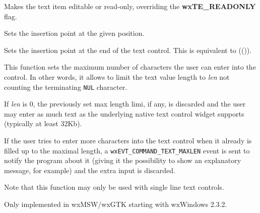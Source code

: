 
Makes the text item editable or read-only, overriding the {\bf wxTE\_READONLY} flag.



\label{wxtextctrlsetinsertionpoint}


Sets the insertion point at the given position.



\label{wxtextctrlsetinsertionpointend}


Sets the insertion point at the end of the text control. This is equivalent
to (()).

\label{wxtextctrlsetmaxlength}


This function sets the maximum number of characters the user can enter into the
control. In other words, it allows to limit the text value length to {\it len}
not counting the terminating {\tt NUL} character.

If {\it len} is $0$, the previously set max length limi, if any, is discarded
and the user may enter as much text as the underlying native text control
widget supports (typically at least 32Kb).

If the user tries to enter more characters into the text control when it
already is filled up to the maximal length, a
{\tt wxEVT\_COMMAND\_TEXT\_MAXLEN} event is sent to notify the program about it
(giving it the possibility to show an explanatory message, for example) and the
extra input is discarded.

Note that this function may only be used with single line text controls.


Only implemented in wxMSW/wxGTK starting with wxWindows 2.3.2.

